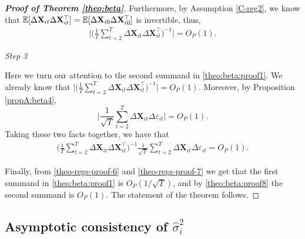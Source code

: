 \begin{proof}[\textnormal{\textbf{Proof of Theorem \ref{theo:beta}}}]
Furthermore, by Assumption \ref{C-reg2}, we know that $\mathbb{E} [\Delta \mathbf{X}_{it} \Delta \mathbf{X}_{it}^\top] = \mathbb{E} [\Delta \mathbf{X}_{i0} \Delta \mathbf{X}_{i0}^\top]$ is invertible, thus, 
\begin{align}\label{theo-regs-proof-7}
\Bigg|  \Big(\frac{1}{T}\sum_{t=2}^T\Delta \mathbf{X}_{it} \Delta \mathbf{X}_{it}^\top\Big)^{-1}\Bigg| = O_P(1).
\end{align}


\vspace{2mm}
{\it Step 3}

Here we turn our attention to the second summand in \eqref{theo:beta:proof1}. We already know that $\Big|  \big(\frac{1}{T}\sum_{t=2}^T\Delta \mathbf{X}_{it} \Delta \mathbf{X}_{it}^\top\big)^{-1}\Big| = O_P(1)$. Moreover, by Proposition \ref{propA:beta4}, 
\[ \bigg| \frac{1}{\sqrt{T}}\sum_{t=2}^T \Delta \mathbf{X}_{it}\Delta \varepsilon_{it} \bigg| = O_P(1).
\]
Taking these two facts together, we have that 
\begin{align}\label{theo:beta:proof8}
\Big(\frac{1}{T} \sum_{t=2}^T \Delta \mathbf{X}_{it} \Delta \mathbf{X}_{it}^\top \Big)^{-1}\frac{1}{\sqrt{T}} \sum_{t=2}^T \Delta \mathbf{X}_{it} \Delta \varepsilon_{it} = O_P(1).
\end{align}

Finally, from \eqref{theo-regs-proof-6} and \eqref{theo-regs-proof-7} we get that the first summand in \eqref{theo:beta:proof1} is $O_P(1/\sqrt{T})$, and by \eqref{theo:beta:proof8} the second summand is $O_P(1)$. The statement of the theorem follows.
\end{proof}

\subsection{Asymptotic consistency of $\widehat{\sigma}_i^2$}\label{subsec:app:lrv}

